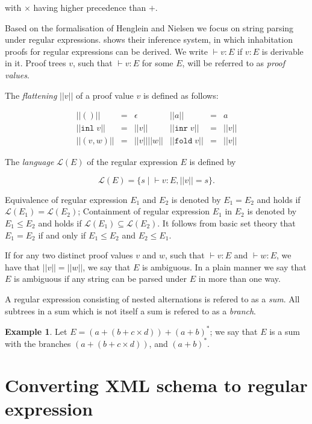 \documentclass[a4paper, oneside]{memoir}
\let\Fref\undefined
\theoremstyle{definition}
\newtheorem{example}{Example}
\begin{document}
\noindent with $\times$ having higher precedence than $+$.

Based on the formalisation of Henglein and Nielsen \cite{heni2010} we focus on
string parsing under regular expressions. \Fref{fig:inhabitation_proofs}
shows their inference system, in which inhabitation proofs for regular
expressions can be derived. We write $\vdash v : E$ if $v : E$ is derivable in
it. Proof trees $v$, such that $\vdash v : E$ for some $E$, will be referred to
as \emph{proof values}.

The \emph{flattening} $||v||$ of a proof value $v$ is defined as follows:

\[
\begin{array}{rclrcl}
||()|| & = & \epsilon &
||a||  & = & a \\
|| \mathtt{inl} \; v|| & = & ||v|| &
|| \mathtt{inr} \; v|| & = & ||v|| \\
|| (v,w)|| & = & ||v||||w|| &
|| \mathtt{fold} \; v|| & = & ||v||
\end{array}
\]

The \emph{language} $\mathcal{L}(E)$ of the regular expression $E$ is defined by

\[
\mathcal{L}(E) = \{ s \; | \; \vdash v : E, ||v|| = s \}.
\]

Equivalence of regular expression $E_1$ and $E_2$ is denoted by $E_1 = E_2$ and
holds if $\mathcal{L}(E_1) = \mathcal{L}(E_2)$; Containment of regular
expression $E_1$ in $E_2$ is denoted by $E_1 \le E_2$ and holds if
$\mathcal{L}(E_1) \subseteq \mathcal{L}(E_2)$.  It follows from basic set theory
that $E_1 = E_2$ if and only if $E_1 \le E_2$ and $E_2 \le E_1$.

If for any two distinct proof values $v$ and $w$, such that $\vdash v : E$ and
$\vdash w : E$, we have that $||v|| = ||w||$, we say that $E$ is ambiguous. In a
plain manner we say that $E$ is ambiguous if any string can be parsed under $E$
in more than one way.

A regular expression consisting of nested alternations is refered to as a \emph{sum}.
All subtrees in a sum which is not itself a sum is refered to as a \emph{branch}.

\begin{example}
Let $E = (a + (b + c \times d)) + (a + b)^{*}$; we say that $E$ is a sum with
the branches $(a + (b + c \times d))$, and $(a + b)^{\ast}$.
\end{example}

\chapter{Converting XML schema to regular expression}
\label{sec:convert}
\end{document}
